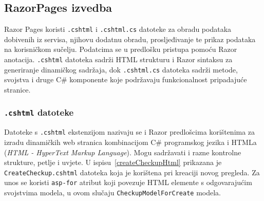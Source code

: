 \subsection{RazorPages izvedba}
\label{subsec:izvedbaRP}

Razor Pages koristi \texttt{.cshtml} i \texttt{.cshtml.cs} datoteke za obradu podataka dobivenih iz servisa, njihovu dodatnu obradu, prosljeđivanje te prikaz podataka na korisničkom sučelju. Podatcima se u predlošku pristupa pomoću Razor anotacija. \texttt{.cshtml} datoteka sadrži HTML strukturu i Razor sintaksu za generiranje dinamičkog sadržaja, dok \texttt{.cshtml.cs} datoteka sadrži metode, svojstva i druge C\# komponente koje podržavaju funkcionalnost pripadajuće stranice.
\subsubsection{\texttt{.cshtml} datoteke}
\label{subsubsec:.cshtml}
Datoteke s \texttt{.cshtml} ekstenzijom nazivaju se i Razor predlošcima korištenima za izradu dinamičkih web stranica kombinacijom C\# programskog jezika i HTMLa (\textit{HTML - HyperText Markup Language}). Mogu sadržavati i razne kontrolne strukture, petlje i uvjete. U ispisu~\ref{createCheckupHtml} prikazana je \texttt{CreateCheckup.cshtml} datoteka koja je korištena pri kreaciji novog pregleda. Za unos se koristi \texttt{asp-for} atribut koji povezuje HTML elemente s odgovarajućim svojstvima modela, u ovom slučaju \texttt{CheckupModelForCreate} modela.

